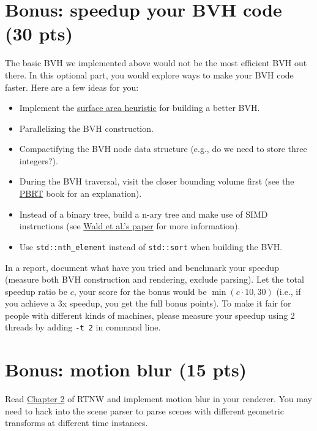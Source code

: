\section{Bonus: speedup your BVH code (30 pts)}
The basic BVH we implemented above would not be the most efficient BVH out there. In this optional part, you would explore ways to make your BVH code faster. Here are a few ideas for you:
\begin{itemize}
  \item Implement the \href{https://www.pbr-book.org/3ed-2018/Primitives_and_Intersection_Acceleration/Bounding_Volume_Hierarchies#TheSurfaceAreaHeuristic}{surface area heuristic} for building a better BVH.
  \item Parallelizing the BVH construction.
  \item Compactifying the BVH node data structure (e.g., do we need to store three integers?).
  \item During the BVH traversal, visit the closer bounding volume first (see the \href{https://www.pbr-book.org/3ed-2018/Primitives_and_Intersection_Acceleration/Bounding_Volume_Hierarchies#Traversal}{PBRT} book for an explanation).
  \item Instead of a binary tree, build a n-ary tree and make use of SIMD instructions (see \href{http://www.cs.cmu.edu/afs/cs/academic/class/15869-f11/www/readings/wald08_widebvh.pdf}{Wald et al.'s paper} for more information).
  \item Use \lstinline{std::nth_element} instead of \lstinline{std::sort} when building the BVH.
\end{itemize}

In a report, document what have you tried and benchmark your speedup (measure both BVH construction and rendering, exclude parsing).
Let the total speedup ratio be $c$, your score for the bonus would be $\min(c \cdot 10, 30)$ (i.e., if you achieve a 3x speedup, you get the full bonus points).
To make it fair for people with different kinds of machines, please measure your speedup using 2 threads by adding \lstinline{-t 2} in command line.

\section{Bonus: motion blur (15 pts)}
Read \href{https://raytracing.github.io/books/RayTracingTheNextWeek.html#motionblur}{Chapter 2} of RTNW and implement motion blur in your renderer. You may need to hack into the scene parser to parse scenes with different geometric transforms at different time instances.

%
%


